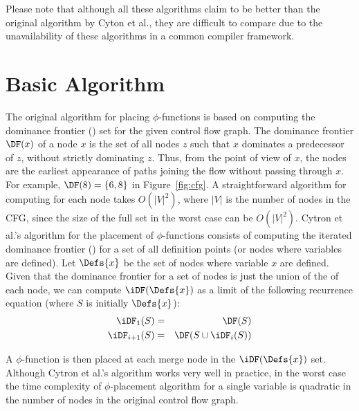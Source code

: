 {Please note that although all these algorithms claim to be better than the original algorithm by Cyton et al., they are difficult to compare due to the unavailability of these algorithms in a common compiler framework. 



\section{Basic Algorithm}
The original algorithm for placing $\phi$-functions
is based on computing the dominance frontier (\DF) set for the given control flow graph. The dominance frontier $\DF(x)$ of a node $x$ is the set of all nodes 
 $z$ such that $x$ dominates a predecessor of $z$, without strictly dominating $z$. Thus, from the point of view of $x$, the \DF nodes are the earliest appearance of paths joining the flow without passing through $x$.
For example, $\DF(8)= \{ 6, 8 \}$ in Figure~\ref{fig:cfg}. A straightforward algorithm for computing
\DF for each node takes $O(|V|^2)$, where $|V|$ is the number of nodes in the 
CFG, since the size of the full \DF set in the worst case can be $O(|V|^2)$.
Cytron et al.'s algorithm for the placement of $\phi$-functions consists of 
computing the iterated dominance frontier (\iDF) for a set of all definition points (or nodes where
variables are defined). 
Let $\Defs{x}$ be the set of nodes where variable $x$ are  defined.
Given that the dominance frontier for a set of nodes is just the
union of the \DF of each node, we can compute $\iDF(\Defs{x})$ as a limit of
the following recurrence equation (where $S$ is initially $\Defs{x}$):
\begin{eqnarray*}
\iDF_1(S) &=& \DF(S) \\
\iDF_{i+1} (S) &=& \DF(S \cup \iDF_i(S)) 
\end{eqnarray*}

A $\phi$-function is then placed at each merge node in the  $\iDF(\Defs{x})$ set. 
Although Cytron et al.'s
algorithm works very well in practice, in the worst case the time complexity of $\phi$-placement algorithm for a single variable is quadratic in the number of nodes in the original control flow graph.


}
